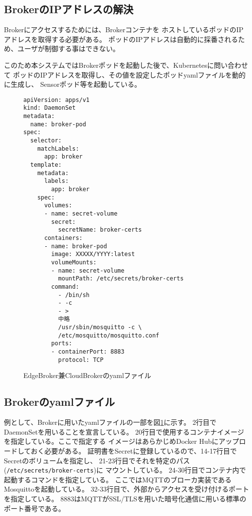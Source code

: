 \documentclass[submit,techrep]{ipsj}
\newcommand{\reffig}[1]{図\ref{#1}}
\newcommand{\kbs}{Kubernetes}
\begin{document}
\subsection{BrokerのIPアドレスの解決}
Brokerにアクセスするためには、Brokerコンテナを
ホストしているポッドのIPアドレスを取得する必要がある。
ポッドのIPアドレスは自動的に採番されるため、ユーザが制御する事はできない。

このため本システムではBrokerポッドを起動した後で、\kbs に問い合わせて
ポッドのIPアドレスを取得し、その値を設定したポッドyamlファイルを動的に生成し、
Sensorポッド等を起動している。

\begin{figure}[tbp]
  \renewcommand{\baselinestretch}{0.9}
  \begin{lstlisting}
apiVersion: apps/v1
kind: DaemonSet
metadata:
  name: broker-pod
spec:
  selector:
    matchLabels:
      app: broker
  template:
    metadata:
      labels:
        app: broker
    spec:
      volumes:
      - name: secret-volume
        secret:
          secretName: broker-certs
      containers:
      - name: broker-pod
        image: XXXXX/YYYY:latest
        volumeMounts:
        - name: secret-volume
          mountPath: /etc/secrets/broker-certs
        command:
          - /bin/sh
          - -c
          - >
          中略
          /usr/sbin/mosquitto -c \
          /etc/mosquitto/mosquitto.conf
        ports:
        - containerPort: 8883
          protocol: TCP
  \end{lstlisting}
  \caption{EdgeBroker兼CloudBrokerのyamlファイル}
  \label{broker-yaml}
\end{figure}


\subsection{Brokerのyamlファイル}
例として、Brokerに用いたyamlファイルの一部を\reffig{broker-yaml}に示す。
2行目でDaemonSetを用いることを宣言している。
20行目で使用するコンテナイメージを指定している。ここで指定する
イメージはあらかじめDocker Hubにアップロードしておく必要がある。
証明書をSecretに登録しているので、14-17行目でSecretのボリュームを指定し、
21-23行目でそれを特定のパス(\verb|/etc/secrets/broker-certs|)に
マウントしている。
24-30行目でコンテナ内で起動するコマンドを指定している。
ここではMQTTのブローカ実装であるMosquitto\cite{Mosquitto}を起動している。
32-33行目で、外部からアクセスを受け付けるポートを指定している。
8883はMQTTがSSL/TLSを用いた暗号化通信に用いる標準のポート番号である。
\end{document}
